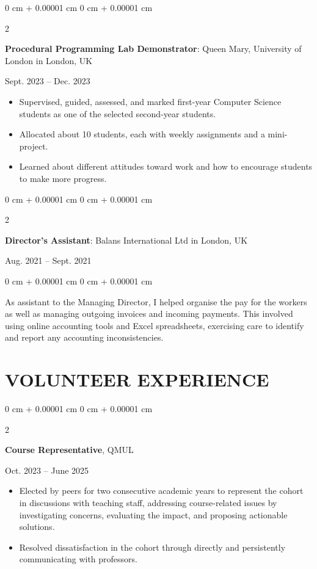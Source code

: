 \documentclass[10pt, letterpaper]{article}
\newenvironment{highlights}{
    \begin{itemize}[
        topsep=0.10 cm,
        parsep=0.10 cm,
        partopsep=0pt,
        itemsep=0pt,
        leftmargin=0 cm + 10pt
    ]
}{
    \end{itemize}
} %
\newenvironment{onecolentry}{
    \begin{adjustwidth}{
        0 cm + 0.00001 cm
    }{
        0 cm + 0.00001 cm
    }
}{
    \end{adjustwidth}
} %
\newenvironment{twocolentry}[2][]{
    \onecolentry
    \def\secondColumn{#2}
    \setcolumnwidth{\fill, 4.5 cm}
    \begin{paracol}{2}
}{
    \switchcolumn \raggedleft \secondColumn
    \end{paracol}
    \endonecolentry
} %
\begin{document}
        \vspace{0.2cm}
        \begin{twocolentry}
            {Sept. 2023 – Dec. 2023}
            \textbf{Procedural Programming Lab Demonstrator}: Queen Mary, University of London in London, UK
        \end{twocolentry}
        \begin{highlights}
            \item Supervised, guided, assessed, and marked first-year Computer Science students as one of the selected second-year students.
            \item Allocated about 10 students, each with weekly assignments and a mini-project.
            \item Learned about different attitudes toward work and how to encourage students to make more progress.
        \end{highlights}
        
        \vspace{0.2cm}
        \begin{twocolentry}{
            Aug. 2021 – Sept. 2021
        }
            \textbf{Director’s Assistant}: Balans International Ltd in London, UK
        \end{twocolentry}
        \begin{onecolentry}
            As assistant to the Managing Director, I helped organise the pay for the workers as well as managing outgoing invoices and incoming payments. This involved using online accounting tools and Excel spreadsheets, exercising care to identify and report any accounting inconsistencies.
        \end{onecolentry}
    
    
    \section{VOLUNTEER EXPERIENCE}
        \begin{twocolentry}{
            Oct. 2023 – June 2025
            }
            \textbf{Course Representative}, QMUL
        \end{twocolentry}
        \begin{highlights}
            \item Elected by peers for two consecutive academic years to represent the cohort in discussions with teaching staff, addressing course-related issues by investigating concerns, evaluating the impact, and proposing actionable solutions.
            \item Resolved dissatisfaction in the cohort through directly and persistently communicating with professors.
        \end{highlights}
\end{document}
